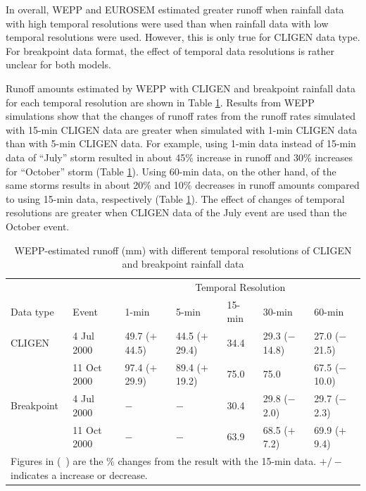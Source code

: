 In overall, WEPP and EUROSEM estimated greater runoff when rainfall data
with high temporal resolutions were used than when rainfall data with low
temporal
resolutions were used. However, this is only true for CLIGEN data type. For
breakpoint data format, the effect of temporal data resolutions is rather
unclear for
both models.

Runoff amounts estimated by WEPP with CLIGEN and breakpoint rainfall data for
each temporal resolution are shown in Table
\ref{tab:DifferentTemporalScalesOfRainfallDataOnWEPPRunoffEstimation}. Results
from WEPP simulations show that the changes of runoff rates from the runoff
rates simulated with 15-min CLIGEN data are greater when simulated with 1-min
CLIGEN data than with 5-min CLIGEN data. For example, using 1-min data instead
of 15-min data of ``July'' storm resulted in about 45\% increase in runoff and
30\% increases for ``October'' storm (Table
\ref{tab:DifferentTemporalScalesOfRainfallDataOnWEPPRunoffEstimation}). Using
60-min data, on the other hand, of the same storms results in about 20\% and
10\% decreases in runoff amounts compared to using 15-min data, respectively
(Table \ref{tab:DifferentTemporalScalesOfRainfallDataOnWEPPRunoffEstimation}).
The effect of changes of temporal resolutions are greater when CLIGEN data of
the
July event are used than the October event.

\begin{table}[htbp]
  \centering
  \footnotesize
  \caption[WEPP-estimated runoff with different temporal resolutions of CLIGEN
and
breakpoint rainfall data]{WEPP-estimated runoff (mm) with different temporal
resolutions of CLIGEN and breakpoint rainfall data}
  \label{tab:DifferentTemporalScalesOfRainfallDataOnWEPPRunoffEstimation}
    \begin{tabular}{lllllll}
      \toprule
      & & \multicolumn{5}{c}{Temporal Resolution}\\
      \cmidrule{3-7}
      Data type & Event & 1-min & 5-min & 15-min & 30-min & 60-min \\
      \midrule
      CLIGEN & 4 Jul 2000 & 49.7 ($+$44.5) & 44.5 ($+$29.4) & 34.4 & 29.3
($-$14.8) & 27.0 ($-$21.5) \\
       & 11 Oct 2000 & 97.4 ($+$29.9) & 89.4 ($+$19.2) & 75.0 & 75.0 & 67.5
($-$10.0) \\
       \midrule
      Breakpoint & 4 Jul 2000 & $-$ & $-$ & 30.4 & 29.8 ($-$2.0) & 29.7
($-$2.3)\\
       & 11 Oct 2000 & $-$ & $-$ & 63.9 & 68.5 ($+$7.2) & 69.9 ($+$9.4)\\
      \bottomrule
      \multicolumn{7}{p{12cm}}{\footnotesize Figures in (\ ) are the \% changes
from the result with the 15-min data. $+/-$ indicates a increase or decrease.}\\
    \end{tabular}
\end{table}

